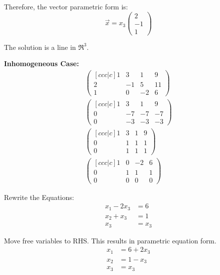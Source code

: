 \noindent
\newline
Therefore, the vector parametric form is:
\begin{equation}
    \Vec{x} = x_3 \begin{pmatrix}
        2 \\
        -1 \\
        1
    \end{pmatrix}
\end{equation}

\noindent
The solution is a line in \(\Re^3\).

\noindent
\newline
\textbf{Inhomogeneous Case:}
\begin{align}
    \begin{pmatrix}[ccc|c]
        1 & 3 & 1 & 9 \\
        2 & -1 & 5 & 11 \\
        1 & 0 & -2 & 6
    \end{pmatrix} \\
    \begin{pmatrix}[ccc|c]
        1 & 3 & 1 & 9 \\
        0 & -7 & -7 & -7 \\
        0 & -3 & -3 & -3
    \end{pmatrix} \\
    \begin{pmatrix}[ccc|c]
        1 & 3 & 1 & 9 \\
        0 & 1 & 1 & 1 \\
        0 & 1 & 1 & 1
    \end{pmatrix} \\
    \begin{pmatrix}[ccc|c]
        1 & 0 & -2 & 6 \\
        0 & 1 & 1 & 1 \\
        0 & 0 & 0 & 0
    \end{pmatrix}
\end{align}

\noindent
\newline
Rewrite the Equations:
\begin{align}
    x_1 - 2x_3 &= 6 \\
    x_2 + x_3 &= 1 \\
    x_3 &= x_3
\end{align}

\noindent
\newline
Move free variables to RHS. This results in parametric equation form.
\begin{align}
    x_1 &= 6 + 2x_3 \\
    x_2 &= 1 - x_3 \\
    x_3 &= x_3
\end{align}

